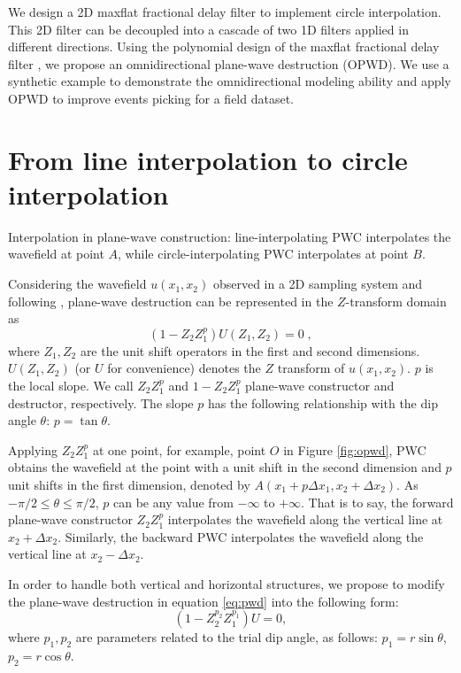 We design a 2D maxflat fractional delay filter 
to implement circle interpolation.
This 2D filter can be decoupled into
a cascade of two 1D filters applied
in different directions.
Using the polynomial design of the maxflat fractional delay filter
\cite[]{chen:2012a},
we propose an omnidirectional plane-wave destruction (OPWD).
We use a synthetic example to demonstrate 
the omnidirectional modeling ability
and apply OPWD to improve events picking 
for a field dataset.



\section{From line interpolation to circle interpolation}

{Interpolation in plane-wave construction: 
line-interpolating PWC interpolates the wavefield at point $A$,
while circle-interpolating PWC interpolates at point $B$.}

Considering the wavefield $u(x_1,x_2)$ observed in a 2D sampling system
and following \cite{fomel:1946}, plane-wave 
destruction can be represented in the $Z$-transform domain as
\begin{equation}\label{eq:pwd}
(1-Z_2Z_1^p)U(Z_1,Z_2)=0\;,
\end{equation}
where
$Z_1, Z_2$ are the unit shift operators in the first and second dimensions.
$U(Z_1,Z_2)$ (or $U$ for convenience) 
denotes the $Z$ transform of $u(x_1,x_2)$.
$p$ is the local slope. We call
$Z_2Z_1^p$ and $1-Z_2Z_1^p$
plane-wave constructor and destructor, respectively.
The slope $p$ has the following relationship with the dip angle $\theta$:
$p=\tan \theta$.

Applying 
$Z_2Z_1^p$ at one point, 
for example, point $O$ in Figure \ref{fig:opwd},
PWC obtains the wavefield at the point
with a unit shift in the second dimension and 
$p$ unit shifts in the first dimension,
denoted by $A(x_1+p\Delta x_1,x_2+\Delta x_2)$.
As $-\pi/2 \leq \theta \leq \pi/2$, 
$p$ can be any value from $-\infty$ to $+\infty$.
That is to say, the forward plane-wave constructor $Z_2Z_1^p$
interpolates 
the wavefield along the vertical line at $x_2+\Delta x_2$.
Similarly, the backward PWC interpolates the wavefield
along the vertical line at $x_2-\Delta x_2$.

In order to handle both vertical and horizontal structures, 
we propose to modify
the plane-wave destruction in equation \ref{eq:pwd}
into the following form:
\begin{equation}\label{eq:opwd}
(1-Z_2^{p_2}Z_1^{p_1})U=0,
\end{equation}
where
$p_1,p_2$ are parameters related to the trial dip angle, as follows:
$p_1=r\sin \theta$, %
$p_2=r\cos \theta$.


